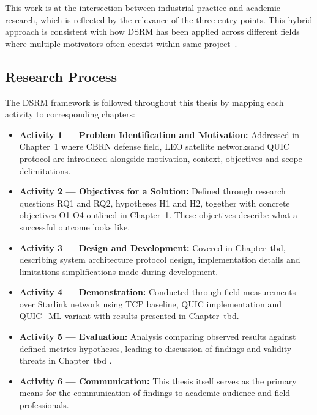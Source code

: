 This work is at the intersection between industrial practice and academic research, which is reflected by the relevance of the three entry points.  This hybrid approach is consistent with how DSRM has been applied across different fields where multiple motivators often coexist within same project~\citep{DSRMethodology2007}.

\subsection{Research Process}

The DSRM framework is followed throughout this thesis by mapping each activity to corresponding chapters:

\begin{itemize}
    \item \textbf{Activity 1 --- Problem Identification and Motivation:} Addressed in Chapter~1 where CBRN defense field, LEO satellite networksand QUIC protocol are introduced alongside motivation, context, objectives and scope delimitations.
    
    \item \textbf{Activity 2 --- Objectives for a Solution:} Defined through research questions RQ1 and RQ2, hypotheses H1 and H2, together with concrete objectives O1-O4 outlined in Chapter~1. These objectives describe what a successful outcome looks like.
    
    \item \textbf{Activity 3 --- Design and Development:} Covered in Chapter~tbd, describing system architecture protocol design, implementation details and limitations simplifications made during development.
    
    \item \textbf{Activity 4 --- Demonstration:} Conducted through field measurements over Starlink network using TCP baseline, QUIC implementation and QUIC+ML variant  with results presented in Chapter~tbd.
    
    \item \textbf{Activity 5 --- Evaluation:} Analysis comparing observed results against defined metrics hypotheses, leading to discussion of findings and validity threats in Chapter~tbd .
    
    \item \textbf{Activity 6 --- Communication:} This thesis itself serves as the primary means for the communication of findings to academic audience and field professionals.
\end{itemize}

